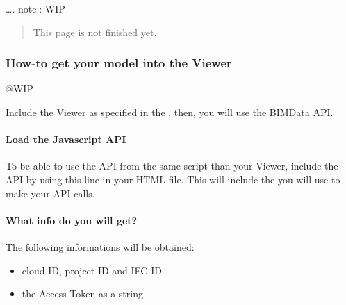 \documentclass[a4paper,12pt,english]{sphinxmanual}
\begin{document}
…. note:: WIP
\begin{quote}

This page is not finished yet.
\end{quote}


\subsubsection{How-to get your model into the Viewer}
\label{\detokenize{viewer/get_your_model_into_the_viewer:how-to-get-your-model-into-the-viewer}}\label{\detokenize{viewer/get_your_model_into_the_viewer::doc}}
@WIP

Include the Viewer as specified in the  {\hyperref[\detokenize{viewer/include_viewer::doc}]{}}, then, you will use the BIMData API.


\paragraph{Load the Javascript API}
\label{\detokenize{viewer/get_your_model_into_the_viewer:load-the-javascript-api}}
To be able to use the API from the same script than your Viewer, include the API by using this line in your HTML file.
This will include the  you will use to make your API calls.

%
\begin{sphinxVerbatim}[commandchars=\\\{\}]
     
\end{sphinxVerbatim}


\paragraph{What info do you will get?}
\label{\detokenize{viewer/get_your_model_into_the_viewer:what-info-do-you-will-get}}
The following informations will be obtained:
\begin{itemize}
\item {} 
cloud ID, project ID and IFC ID

\item {} 
the Access Token as a string

\end{itemize}
\end{document}
